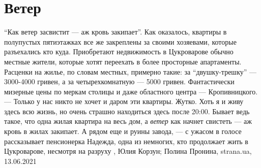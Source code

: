  
 
 
 
 
\chapter{Ветер}

\enquote{Как ветер засвистит — аж кровь закипает}.
Как оказалось, квартиры в полупустых пятиэтажках все же закреплены за своими
хозяевами, которые разъехались кто куда. Приобретают недвижимость в Цукроварове
обычно местные жители, которые хотят переехать в более просторные апартаменты.
Расценки на жилье, по словам местных, примерно такие: за
\enquote{двушку-трешку} — 3000-4000 гривен, а за четырехкомнатную — 5000
гривен.  Фантастически мизерные цены по меркам столицы и даже областного центра
— Кропивницкого.  — Только у нас никто не хочет и даром эти квартиры. Жутко.
Хоть я и живу здесь всю жизнь, но очень страшно находиться здесь после 20:00.
Бывает ведь такое, что одна жилая квартира на весь дом, а \emph{ветер} как
начнет свистеть — аж кровь в жилах закипает. А рядом еще и руины завода, — с
ужасом в голосе рассказывает пенсионерка Надежда, одна из немногих, кто
продолжает жить в Цукроварове, несмотря на разруху
, 
Юлия Корзун; Полина Пронина, strana.ua, 13.06.2021

